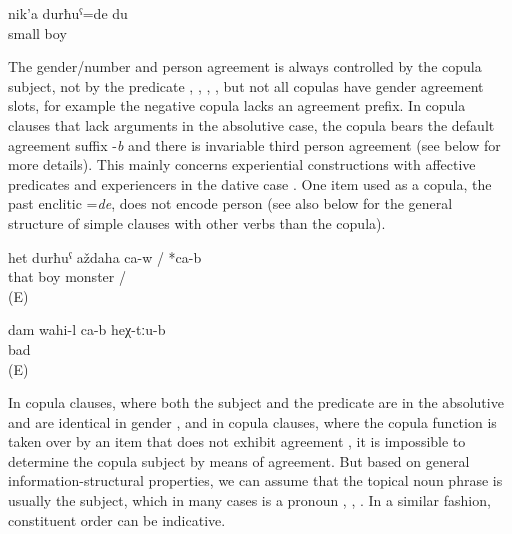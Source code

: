 \begin{exe}
	\ex	\label{ex:‎I was a little boy@A}
	\gll	nik'a	durħuˁ=de	du\\
		small	boy	\\
	\glt	{}
\end{exe}

The gender/number and person agreement is always controlled by the copula subject, not by the predicate , ,  ,  , but not all copulas have gender agreement slots, for example the negative copula lacks an agreement prefix. In copula clauses that lack arguments in the absolutive case, the copula bears the default agreement suffix -\textit{b} and there is invariable third person agreement (see  below for more details). This mainly concerns experiential constructions with affective predicates and experiencers in the dative case . One item used as a copula, the past enclitic =\textit{de}, does not encode person  (see also  below for the general structure of simple clauses with other verbs than the copula).

\begin{exe}
	\ex	\label{ex:‎‎‎That boy is a monster}
	\gll	het	durħuˁ	aždaha	ca-w	/ *ca-b\\
		that	boy	monster		/ \\
	\glt	{} (E)
	
	\ex	\label{ex:I feel(s) bad there}
	\gll	dam	wahi-l	ca-b	heχ-tːu-b\\
			bad		\\
	\glt	{} (E)	
	
\end{exe}


In copula clauses, where both the subject and the predicate are in the absolutive and are identical in gender , and in copula clauses, where the copula function is taken over by an item that does not exhibit agreement , it is impossible to determine the copula subject by means of agreement. But based on general information-structural properties, we can assume that the topical noun phrase is usually the subject, which in many cases is a pronoun , , . In a similar fashion, constituent order can be indicative. 

